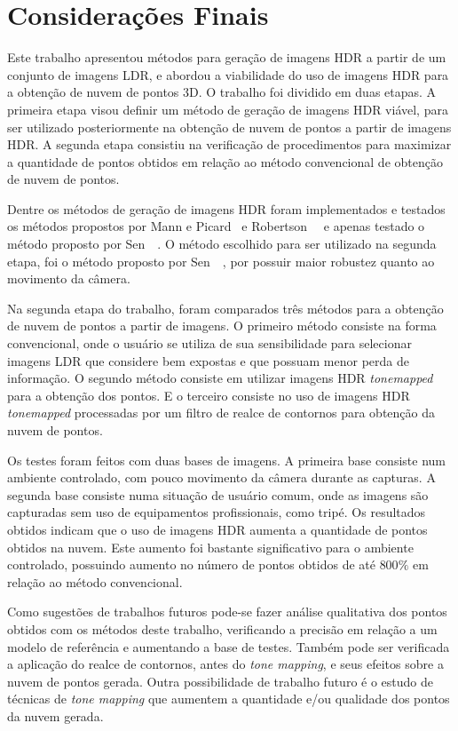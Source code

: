 \chapter{Considerações Finais} \label{conclusao}

Este trabalho apresentou métodos para geração de imagens HDR a partir de um conjunto de imagens LDR, e abordou a viabilidade do uso de imagens HDR para a obtenção de nuvem de pontos 3D. O trabalho foi dividido em duas etapas. A primeira etapa visou definir um método de geração de imagens HDR viável, para ser utilizado posteriormente na obtenção de nuvem de pontos a partir de imagens HDR. A segunda etapa consistiu na verificação de procedimentos para maximizar a quantidade de pontos obtidos em relação ao método convencional de obtenção de nuvem de pontos. 

Dentre os métodos de geração de imagens HDR foram implementados e testados os métodos propostos por Mann e Picard~\cite{mann} e Robertson~\etal~\cite{robertson} e apenas testado o método proposto por  Sen~\etal~\cite{hdrMovimento}. O método escolhido para ser utilizado na segunda etapa, foi o método proposto por Sen~\etal~\cite{hdrMovimento}, por possuir maior robustez quanto ao movimento da câmera.

Na segunda etapa do trabalho, foram comparados três métodos para a obtenção de nuvem de pontos a partir de imagens. O primeiro método consiste na forma convencional, onde o usuário se utiliza de sua sensibilidade para selecionar imagens LDR que considere bem expostas e que possuam menor perda de informação. O segundo método consiste em utilizar imagens HDR \textit{tonemapped} para a obtenção dos pontos. E o terceiro consiste no uso de imagens HDR \textit{tonemapped} processadas por um filtro de realce de contornos para obtenção da nuvem de pontos.

Os testes foram feitos com duas bases de imagens. A primeira base consiste num ambiente controlado, com pouco movimento da câmera durante as capturas. A segunda base consiste numa situação de usuário comum, onde as imagens são capturadas sem uso de equipamentos profissionais, como tripé. Os resultados obtidos indicam que o uso de imagens HDR aumenta a quantidade de pontos obtidos na nuvem. Este aumento foi bastante significativo para o ambiente controlado, possuindo aumento no número de pontos obtidos de até $800\%$ em relação ao método convencional.

Como sugestões de trabalhos futuros pode-se fazer análise qualitativa dos pontos obtidos com os métodos deste trabalho, verificando a precisão em relação a um modelo de referência e aumentando a base de testes. Também pode ser verificada a aplicação do realce de contornos, antes do \textit{tone mapping}, e seus efeitos sobre a nuvem de pontos gerada. Outra possibilidade de trabalho futuro é o estudo de técnicas de \textit{tone mapping} que aumentem a quantidade e/ou qualidade dos pontos da nuvem gerada.

